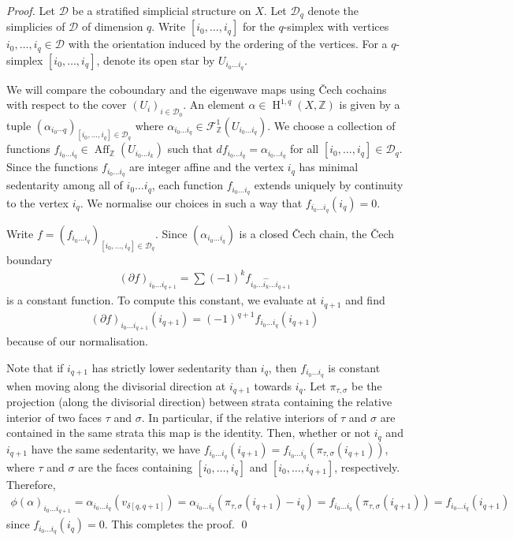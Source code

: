 \documentclass[11pt]{article}
\numberwithin{equation}{numsection}
\newcommand{\Z}{{\mathbb Z}}
\renewcommand{\D}{{\mathcal D}}
\newcommand{\FS}{\mathcal{F}}
\newcommand{\DD}{\mathcal{D}}
\DeclareMathOperator{\Aff}{Aff}
\DeclareMathOperator{\HH}{H}
\begin{document}
\begin{proof}
Let $\DD$ be a stratified simplicial structure on $X$. 
Let $\D_q$ denote the simplicies of $\DD$ of dimension $q$. 
Write $[i_0,\dots,i_q]$ for the $q$-simplex with vertices $i_0,\dots,i_q \in \DD$ with the orientation induced by the ordering of the vertices.  
For a $q$-simplex $[i_0,\dots,i_q]$, denote its open star by $U_{i_0\dots i_q}$. 
 
We will compare the coboundary and the eigenwave maps using  \v{C}ech cochains  with respect to the cover $(U_{i})_{i \in \D_0}$. 
An element $\alpha \in \HH^{1,q}(X, \Z)$ is given by a tuple $(\alpha_{i_0\dotsi q})_{[i_0,\dots,i_q] \in \D_{q}}$ 
where $\alpha_{i_0\dots i_q}  \in \FS^1_{\Z}(U_{i_0 \dots i_q})$. 
We choose a collection of functions  $f_{i_0 \dots i_q} \in \Aff_{\Z}(U_{i_0 \dots i_k})$ such that $d f_{i_0 \dots i_q} = 
\alpha_{i_0 \dots i_q} $ for all $[i_0,\dots,i_q] \in \DD_q$. 
Since  the functions $f_{i_0\dots i_q}$ are integer affine and the vertex $i_q$ has minimal sedentarity among all of $i_0 \dots i_q$, 
each function  $f_{i_0 \dots i_q}$ extends uniquely by continuity to the vertex $i_q$.  
We    normalise our choices  in such a way that $f_{i_0 \dots i_q}(i_q) = 0$. 

Write $f = (f_{i_0 \dots i_q})_{[i_0,\dots,i_q] \in \D_{q}}$.
Since $(\alpha_{i_0 \dots i_q})$ is a closed \v{C}ech chain, 
 the \v{C}ech boundary
\begin{align*}
(\partial f)_{i_0 \dots i_{q+1}} = \sum (-1)^k f_{i_0 \dots \widehat{i_{k}} \dots i_{q+1}}
\end{align*}
is a constant function. 
To compute this constant, we evaluate at $i_{q+1}$ and find
\begin{align*}
(\partial f)_{i_0 \dots i_{q+1}}(i_{q+1}) = (-1)^{q+1} f_{i_0 \dots i_q}(i_{q+1})
\end{align*}
because of our normalisation. 

Note that if $i_{q+1}$ has strictly lower sedentarity than $i_q$, then $f_{i_0 \dots i_q}$ is constant 
when moving along the divisorial direction at $i_{q+1}$  towards $i_q$. 
Let  $\pi_{\tau, \sigma}$ be the projection  (along the divisorial direction) between strata containing the relative interior of two faces  $\tau$ and $\sigma$. 
In particular, if the relative interiors of  $\tau$ and $\sigma$ are contained in the same strata this map is the identity. 
Then, whether or not  $i_{q} $ and $i_{q+1}$ have the same sedentarity, we have
$f_{i_0 \dots i_q}(i_{q+1}) = f_{i_0 \dots i_q}(\pi_{\tau, \sigma} (i_{q+1}))$, 
where $\tau$ and $\sigma$ are the faces containing $[i_0,\dots,i_q]$ and $[i_0,\dots,i_{q+1}]$, respectively. 
Therefore, 
\begin{align*}
\phi(\alpha)_{i_0 \dots i_{q+1}} = \alpha_{i_0 \dots i_q}(v_{\delta[q,q+1]} )  
=  \alpha_{i_0 \dots i_q}(\pi_{\tau, \sigma}(  i_{q+1}) - i_{q} ) 
=  f_{i_0 \dots i_q}(\pi_{\tau, \sigma} ( i_{q+1} ) ) = f_{i_0 \dots i_q}( i_{q+1} ) 
\end{align*}
since $f_{i_0 \dots i_q}(i_{q}) = 0$. 
This completes the proof. \qed
\end{proof}
\end{document}
